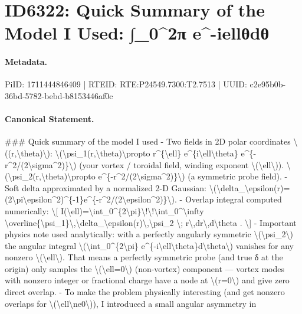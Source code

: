 \section*{ID6322: Quick Summary of the Model I Used: ∫\_0\textasciicircum{}2π e\textasciicircum{}-iellθdθ}
\paragraph{Metadata.}
PiID: 1711444846409 | RTEID: RTE:P24549.7300:T2.7513 | UUID: c2e95b0b-36bd-5782-bebd-b8153446af0c

\paragraph{Canonical Statement.}
\#\#\# Quick summary of the model I used - Two fields in 2D polar coordinates \textbackslash{}((r,\textbackslash{}theta)\textbackslash{}): \textbackslash{}(\textbackslash{}psi\_1(r,\textbackslash{}theta)\textbackslash{}propto r\textasciicircum{}\{\textbackslash{}ell\} e\textasciicircum{}\{i\textbackslash{}ell\textbackslash{}theta\} e\textasciicircum{}\{-r\textasciicircum{}2/(2\textbackslash{}sigma\textasciicircum{}2)\}\textbackslash{}) (your vortex / toroidal field, winding exponent \textbackslash{}(\textbackslash{}ell\textbackslash{})). \textbackslash{}(\textbackslash{}psi\_2(r,\textbackslash{}theta)\textbackslash{}propto e\textasciicircum{}\{-r\textasciicircum{}2/(2\textbackslash{}sigma\textasciicircum{}2)\}\textbackslash{}) (a symmetric probe field). - Soft delta approximated by a normalized 2-D Gaussian: \textbackslash{}(\textbackslash{}delta\_\textbackslash{}epsilon(r)=(2\textbackslash{}pi\textbackslash{}epsilon\textasciicircum{}2)\textasciicircum{}\{-1\}e\textasciicircum{}\{-r\textasciicircum{}2/(2\textbackslash{}epsilon\textasciicircum{}2)\}\textbackslash{}). - Overlap integral computed numerically: \textbackslash{}[ I(\textbackslash{}ell)=\textbackslash{}int\_0\textasciicircum{}\{2\textbackslash{}pi\}\textbackslash{}!\textbackslash{}!\textbackslash{}int\_0\textasciicircum{}\textbackslash{}infty \textbackslash{}overline\{\textbackslash{}psi\_1\}\textbackslash{},\textbackslash{}delta\_\textbackslash{}epsilon(r)\textbackslash{},\textbackslash{}psi\_2 \textbackslash{}; r\textbackslash{},dr\textbackslash{},d\textbackslash{}theta . \textbackslash{}] - Important physics note used analytically: with a perfectly angularly symmetric \textbackslash{}(\textbackslash{}psi\_2\textbackslash{}) the angular integral \textbackslash{}(\textbackslash{}int\_0\textasciicircum{}\{2\textbackslash{}pi\} e\textasciicircum{}\{-i\textbackslash{}ell\textbackslash{}theta\}d\textbackslash{}theta\textbackslash{}) vanishes for any nonzero \textbackslash{}(\textbackslash{}ell\textbackslash{}). That means a perfectly symmetric probe (and true δ at the origin) only samples the \textbackslash{}(\textbackslash{}ell=0\textbackslash{}) (non-vortex) component — vortex modes with nonzero integer or fractional charge have a node at \textbackslash{}(r=0\textbackslash{}) and give zero direct overlap. - To make the problem physically interesting (and get nonzero overlaps for \textbackslash{}(\textbackslash{}ell\textbackslash{}ne0\textbackslash{})), I introduced a small angular asymmetry in 